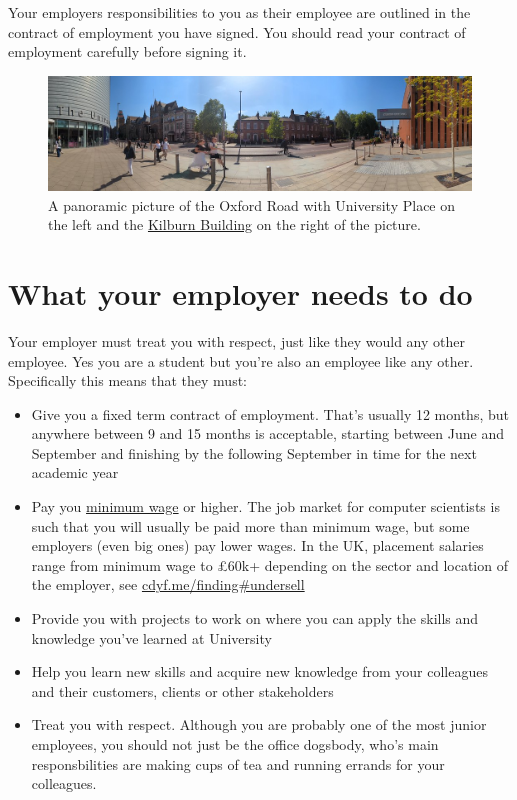 \documentclass[
]{book}
\providecommand{\tightlist}{%
  \setlength{\itemsep}{0pt}\setlength{\parskip}{0pt}}
\begin{document}
Your employers responsibilities to you as their employee are outlined in the contract of employment you have signed. \citep{contract} You should read your contract of employment carefully before signing it.

\begin{figure}

{\centering \includegraphics[width=1\linewidth]{images/sunchester} 

}

\caption{A panoramic picture of the Oxford Road with University Place on the left and the \href{https://en.wikipedia.org/wiki/Kilburn_Building}{Kilburn Building} on the right of the picture.}\label{fig:emloyers-fig}
\end{figure}



\section{What your employer needs to do}\label{eq}

Your employer must treat you with respect, just like they would any other employee. Yes you are a student but you're also an employee like any other. Specifically this means that they must:

\begin{itemize}
\tightlist
\item
  Give you a fixed term contract of employment. That's usually 12 months, but anywhere between 9 and 15 months is acceptable, starting between June and September and finishing by the following September in time for the next academic year \citep{employee}
\item
  Pay you \href{https://www.gov.uk/national-minimum-wage}{minimum wage} or higher. \citep{minimumwage} The job market for computer scientists is such that you will usually be paid more than minimum wage, but some employers (even big ones) pay lower wages. In the UK, placement salaries range from minimum wage to £60k+ depending on the sector and location of the employer, see \href{https://cdyf.me/finding\#undersell}{cdyf.me/finding\#undersell} \citep{finding}
\item
  Provide you with projects to work on where you can apply the skills and knowledge you've learned at University
\item
  Help you learn new skills and acquire new knowledge from your colleagues and their customers, clients or other stakeholders
\item
  Treat you with respect. Although you are probably one of the most junior employees, you should not just be the office dogsbody, who's main responsbilities are making cups of tea and running errands for your colleagues.
\end{itemize}
\end{document}

